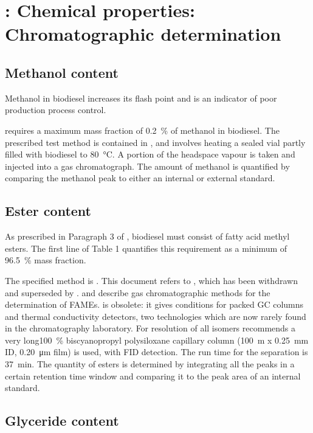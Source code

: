 \section{\texorpdfstring{}{SANS 1935}: Chemical properties: Chromatographic determination}
\label{sec:ChromDet}

\subsection{Methanol content}

Methanol in biodiesel increases its flash point and is an indicator of poor
production process control.

 requires a maximum mass fraction of \SI{0.2}{\percent} of
methanol in biodiesel. The prescribed test method is contained in , and involves heating a sealed vial partly filled with biodiesel to
\SI{80}{\celsius}. A portion of the headspace vapour is taken and injected into
a gas chromatograph. The amount of methanol is quantified by comparing the
methanol peak to either an internal or external standard.

\subsection{Ester content}
\label{sec:EsterContent}
As prescribed in Paragraph 3 of , biodiesel must consist of fatty
acid methyl esters. The first line of Table 1 quantifies this requirement as a
minimum of \SI{96.5}{\percent} mass fraction.

The specified method is . This document refers to , which has been withdrawn and superseded by .
 and  describe gas chromatographic methods for the
determination of FAMEs.  is obsolete: it gives conditions for
packed GC columns and thermal conductivity detectors, two technologies which are
now rarely found in the chromatography laboratory. For resolution of all isomers
 recommends a very long\SI{100}{\percent} biscyanopropyl
polysiloxane capillary column (\SI{100}{\meter} x \SI{0.25}{\milli\metre} ID,
\SI{0.20}{\micro\metre} film) is used, with FID detection. The run time for the
separation is \SI{37}{\minute}. The quantity of esters is determined by
integrating all the peaks in a certain retention time window and comparing it to
the peak area of an internal standard.

\subsection{Glyceride content}
\label{sec:Glycerides}


